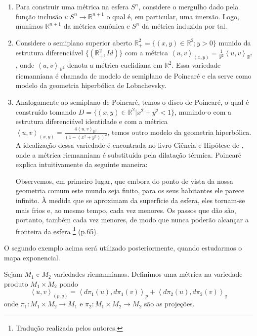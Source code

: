 \begin{examples}
\begin{enumerate}
		\item Para construir uma métrica na esfera $S^{n}$, considere o mergulho dado pela função inclusão $i:S^{n}\to \mathbb{R}^{n+1}$ o qual é, em particular, uma imersão. Logo, munimos $\mathbb{R}^{n+1}$ da métrica canônica e $S^{n}$ da métrica induzida por tal.
		\item Considere o semiplano superior aberto $\mathbb{R}^{2}_{+}=\{ (x,y) \in \mathbb{R}^{2}; y >0 \}$ munido da estrutura diferenciável $\{ (\mathbb{R}^{2}_{+},Id) \}$ com a métrica $\left<u,v\right>_{(x,y)}= \frac{1}{y^2}\left<u,v\right>_{\mathbb{R}^{2}}$, onde $\left<u,v\right>_{\mathbb{R}^{2}}$ denota a métrica euclidiana em $\mathbb{R}^{2}$. Essa variedade riemanniana é chamada de modelo de semiplano de Poincaré e ela serve como modelo da geometria hiperbólica de Lobachevsky.
		\item Analogamente ao semiplano de Poincaré, temos o disco de Poincaré, o qual é construído tomando $D=\{ (x,y)\in \mathbb{R}^{2}|x^{2}+y^{2}< 1 \}$, munindo-o com a estrutura diferenciável identidade e com a métrica $\left<u,v\right>_{(x,y)}=\frac{4\left<u,v\right>_{\mathbb{R}^{2}}}{(1-(x^{2}+y^{2}))^{2}}$, temos outro modelo da geometria hiperbólica. A idealização dessa variedade é encontrada no livro Ciência e Hipótese de \textcite{poincare1905}, onde a métrica riemanniana é substituída pela dilatação térmica. Poincaré explica intuitivamente da seguinte maneira:
		      \begin{citacao}
			      Observemos, em primeiro lugar, que embora do ponto de vista da nossa geometria comum este mundo seja finito, para os seus habitantes ele parece infinito. À medida que se aproximam da superfície da esfera, eles tornam-se mais frios e, ao mesmo tempo, cada vez menores. Os passos que dão são, portanto, também cada vez menores, de modo que nunca poderão alcançar a fronteira da esfera \footnote{Tradução realizada pelos autores.} (p.65).
		      \end{citacao}
	\end{enumerate}
\end{examples}
O segundo exemplo acima será utilizado posteriormente, quando estudarmos o mapa exponencial.
\begin{example}
	\label{ex:metrica-produto}
	Sejam $M_{1}$ e $M_{2}$ variedades riemannianas. Definimos uma métrica na variedade produto $M_{1}\times M_{2}$ pondo
	\begin{equation*}
		\left< u, v \right>_{(p,q)}=\left< d\pi_{1}(u), d\pi_{1}(v) \right>_{p}+\left< d\pi_{2}(u),d\pi_{2}(v)  \right>_{q}
	\end{equation*}
	onde $\pi_{1}:M_{1}\times M_{2} \to M_{1}$ e $\pi_{2}:M_{1}\times M_{2}\to M_{2}$ são as projeções.
\end{example}
